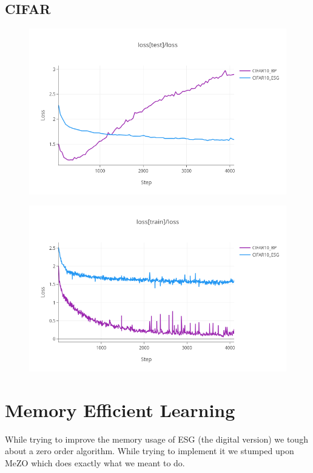 \documentclass[nohyperref]{article}
\theoremstyle{plain}
\theoremstyle{definition}
\theoremstyle{remark}
\begin{document}
\subsection{CIFAR}
\begin{figure}[ht]
\vskip 0.2in
\begin{center}
\centerline{\includegraphics[width=\columnwidth]{images/CIFAR10_test.png}}
\caption{}
\end{center}
\vskip -0.2in
\end{figure}
\begin{figure}[ht]
\vskip 0.2in
\begin{center}
\centerline{\includegraphics[width=\columnwidth]{images/CIFAR10_train.png}}
\caption{}
\end{center}
\vskip -0.2in
\end{figure}


\section{Memory Efficient Learning}
While trying to improve the memory usage of ESG (the digital version) we tough about a zero order algorithm.
While trying to implement it we stumped upon MeZO \cite{malladi2023finetuning} which does exactly what we meant to do.  
\end{document}
